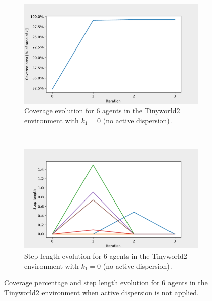 \begin{figure}[H]
  \centering
  \begin{subfigure}[t]{0.5\textwidth}
    \centering
    \includegraphics[width=\textwidth]{figs/tinyworld2_6_agnt_k_1_0_k_2_1_area_traj.pdf}
    \caption{Coverage evolution for 6 agents in the Tinyworld2 environment with $k_{1} = 0$ (no active dispersion).}
    \label{fig:6_agnt_tw2_k_1_0_a_traj}
  \end{subfigure}%
  ~ 
  \begin{subfigure}[t]{0.5\textwidth}
    \centering
    \includegraphics[width=\textwidth]{figs/tinyworld2_6_agnt_k_1_0_k_2_1_step_traj.pdf}
    \caption{Step length evolution for 6 agents in the Tinyworld2 environment with $k_{1} = 0$ (no active dispersion).}
    \label{fig:6_agnt_tw2_k_1_0_s_traj}
  \end{subfigure}
  \caption{Coverage percentage and step length evolution for 6 agents in the Tinyworld2 environment when active dispersion is not applied.}
  \label{fig:6_agnt_tw2_evolution}
\end{figure}

